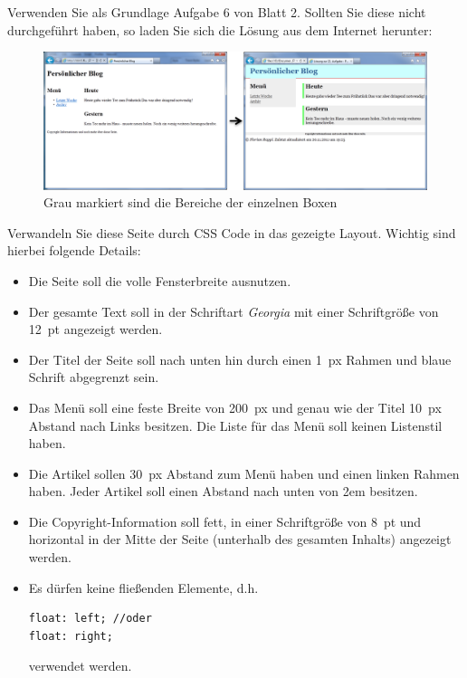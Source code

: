 %
\par Verwenden Sie als Grundlage Aufgabe 6 von Blatt 2. Sollten Sie diese nicht
durchgeführt haben, so laden Sie sich die Lösung aus dem Internet herunter:
%
\begin{figure}[!h]
\centering
\includegraphics[width=1\textwidth]{Exercises/Figures/applycss.png}
\caption{Grau markiert sind die Bereiche der einzelnen Boxen}
\label{fig:applycss}
\end{figure}
%
\par Verwandeln Sie diese Seite durch CSS Code in das gezeigte Layout. Wichtig
sind hierbei folgende Details:
%
\begin{itemize}
\item
Die Seite soll die volle Fensterbreite ausnutzen.
\item
Der gesamte Text soll in der Schriftart \emph{Georgia} mit einer Schriftgröße
von \qty{12}{pt} angezeigt werden.
\item
Der Titel der Seite soll nach unten hin durch einen \qty{1}{px} Rahmen und
blaue Schrift abgegrenzt sein.
\item
Das Menü soll eine feste Breite von \qty{200}{px} und genau wie der Titel
\qty{10}{px} Abstand nach Links besitzen. Die Liste für das Menü soll keinen
Listenstil haben.
\item
Die Artikel sollen \qty{30}{px} Abstand zum Menü haben und einen linken Rahmen
haben. Jeder Artikel soll einen Abstand nach unten von 2em besitzen.
\item
Die Copyright-Information soll fett, in einer Schriftgröße von \qty{8}{pt} und
horizontal in der Mitte der Seite (unterhalb des gesamten Inhalts) angezeigt
werden. 
\item
Es dürfen keine fließenden Elemente, d.h.
%
\begin{lstlisting}
float: left; //oder
float: right;
\end{lstlisting}
%
verwendet werden.
\end{itemize}